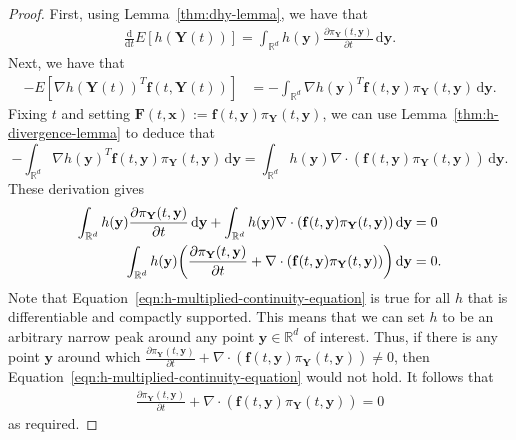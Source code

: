 \documentclass[10pt]{article}
\newcommand{\dee}{\mathrm{d}}
\newcommand{\ve}[1]{\mathbf{#1}}
\newcommand{\Real}{\mathbb{R}}
\begin{document}
\begin{itemize}
\begin{proof}
    First, using Lemma~\ref{thm:dhy-lemma}, we have that 
    \begin{align*}
      \frac{\dee}{\dee t} E[h(\ve{Y}(t))] = \int_{\Real^d} h(\ve{y}) \frac{\partial \pi_{\ve{Y}}(t, \ve{y})}{\partial t}\, \dee\ve{y}.
    \end{align*}
    Next, we have that
    \begin{align*}
      - E[\nabla h(\ve{Y}(t))^T \ve{f}(t, \ve{Y}(t))] 
      &= - \int_{\Real^d} \nabla h(\ve{y})^T \ve{f}(t, \ve{y}) \pi_{\ve{Y}}(t,\ve{y}) \, \dee\ve{y}.
    \end{align*}
    Fixing $t$ and setting $\ve{F}(t,\ve{x}) := \ve{f}(t, \ve{y}) \pi_{\ve{Y}}(t,\ve{y})$, we can use Lemma~\ref{thm:h-divergence-lemma} to deduce that 
    $$
    - \int_{\Real^d} \nabla h(\ve{y})^T \ve{f}(t, \ve{y}) \pi_{\ve{Y}}(t,\ve{y}) \, \dee\ve{y}
    = \int_{\Real^d} h(\ve{y}) \nabla \cdot (\ve{f}(t, \ve{y}) \pi_{\ve{Y}}(t,\ve{y})) \, \dee\ve{y}.
    $$
    These derivation gives
    \begin{align}
      \int_{\Real^d} h(\ve{y}) \frac{\partial \pi_{\ve{Y}}(t, \ve{y})}{\partial t}\, \dee\ve{y}
      + \int_{\Real^d} h(\ve{y}) \nabla \cdot (\ve{f}(t, \ve{y}) \pi_{\ve{Y}}(t,\ve{y})) \, \dee\ve{y}
      &= 0 \notag \\
      \int_{\Real^d} h(\ve{y}) \bigg( \frac{\partial \pi_{\ve{Y}}(t, \ve{y})}{\partial t} + \nabla \cdot (\ve{f}(t, \ve{y}) \pi_{\ve{Y}}(t,\ve{y}))  \bigg)\, \dee\ve{y}
      &= 0. \label{eqn:h-multiplied-continuity-equation}
    \end{align}
    Note that Equation~\ref{eqn:h-multiplied-continuity-equation} is true for all $h$ that is differentiable and compactly supported. This means that we can set $h$ to be an arbitrary narrow peak around any point $\ve{y} \in \Real^d$ of interest. Thus, if there is any point $\ve{y}$ around which $\frac{\partial \pi_{\ve{Y}}(t, \ve{y})}{\partial t} + \nabla \cdot (\ve{f}(t, \ve{y}) \pi_{\ve{Y}}(t,\ve{y})) \neq 0$, then Equation~\ref{eqn:h-multiplied-continuity-equation} would not hold. It follows that
    \begin{align*}
      \frac{\partial \pi_{\ve{Y}}(t, \ve{y})}{\partial t} + \nabla \cdot (\ve{f}(t, \ve{y}) \pi_{\ve{Y}}(t,\ve{y})) = 0
    \end{align*}
    as required.
  \end{proof}


\end{itemize}
\end{document}

